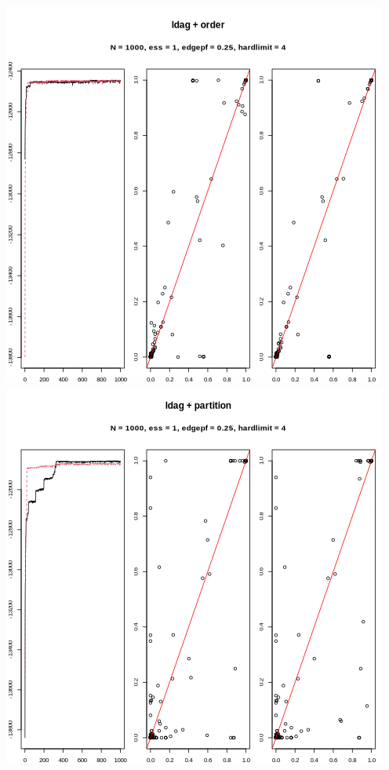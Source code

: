 \documentclass[
]{article}
\begin{document}
\includegraphics{edgeps_child_ldag_order.png}
\includegraphics{edgeps_child_ldag_partition.png}
\end{document}
